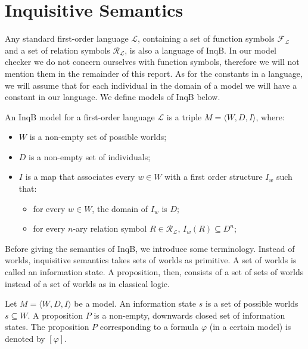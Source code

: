 \section{Inquisitive Semantics}\label{sec: InqB}
Any standard first-order language $\mathcal{L}$, containing a set of function symbols $\mathcal{F}_\mathcal{L}$ and a set of relation symbols $\mathcal{R}_\mathcal{L}$, is also a language of \textsf{InqB}. In our model checker we do not concern ourselves with function symbols, therefore we will not mention them in the remainder of this report. As for the constants in a language, we will assume that for each individual in the domain of a model we will have a constant in our language. We define models of \textsf{InqB} below.

\begin{defi}\label{def: InqBModel}
An \textsf{InqB} model for a first-order language $\mathcal{L}$ is a triple $M=\langle W,D,I\rangle$, where:
\begin{itemize}
\setlength\itemsep{-0.3em}
    \item $W$ is a non-empty set of possible worlds;
    \item $D$ is a non-empty set of individuals;
    \item $I$ is a map that associates every $w\in W$ with a first order structure $I_w$ such that:
    \begin{itemize}
    \setlength\itemsep{-0.3em}
        \item for every $w\in W$, the domain of $I_w$ is $D$;
        \item for every $n$-ary relation symbol $R\in \mathcal{R}_{\mathcal{L}}$, $I_w(R)\subseteq D^n$;
    \end{itemize}
\end{itemize}
\end{defi}

Before giving the semantics of \textsf{InqB}, we introduce some terminology. Instead of worlds, inquisitive semantics takes sets of worlds as primitive. A set of worlds is called an information state. A proposition, then, consists of a set of sets of worlds instead of a set of worlds as in classical logic.

\begin{defi}\label{defprop}
 Let $M=\langle W,D,I\rangle$ be a model. An information state $s$ is a set of possible worlds $s\subseteq W$. A proposition $P$ is a non-empty, downwards closed set of information states. The proposition $P$ corresponding to a formula $\varphi$ (in a certain model) is denoted by $[\varphi]$.
\end{defi}

